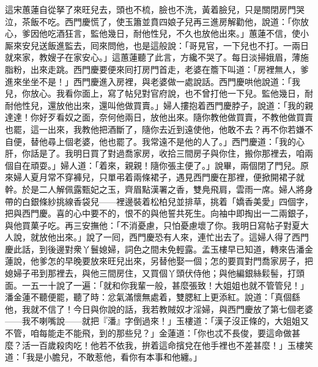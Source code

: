 這宋蕙蓮自從拏了來旺兒去，頭也不梳，臉也不洗，黃着臉兒，只是關閉房門哭泣，茶飯不吃。西門慶慌了，使玉簫並賁四娘子兒再三進房解勸他，說道：「你放心，爹因他吃酒狂言，監他幾日，耐他性兒，不久也放他出來。」蕙蓮不信，使小厮來安兒送飯進監去，囘來問他，也是這般說：「哥見官，一下兒也不打。一兩日就來家，教嫂子在家安心。」這蕙蓮聽了此言，方纔不哭了。每日淡掃娥眉，薄施脂粉，出來走跳。西門慶要便來囘打房門首走，老婆在簷下叫道：「房裡無人，爹進來坐坐不是！」西門慶進入房裡，與老婆做一處說話。西門慶哄他說道：「我兒，你放心。我看你面上，寫了帖兒對官府說，也不曾打他一下兒。監他幾日，耐耐他性兒，還放他出來，還叫他做買賣。」婦人摟抱着西門慶脖子，說道：「我的親達達！你好歹看奴之面，{}奈何他兩日，放他出來。隨你教他做買賣，不教他做買賣也罷，這一出來，我教他把酒斷了，隨你去近到遠使他，他敢不去？再不你若嫌不自便，替他尋上個老婆，他也罷了。我常遠不是他的人了。」西門慶道：「我的心肝，你話是了。我明日買了對過喬家房，收拾三間房子與你住，搬你那裡去，咱兩個自在頑耍。」婦人道：「着來，親親！隨你張主便了。」說畢，兩個閉了門兒。原來婦人夏月常不穿褲兒，只單弔着兩條裙子，遇見西門慶在那裡，便掀開裙子就幹。於是二人解佩露甄妃之玉，齊眉點漢署之香，雙鳧飛肩，雲雨一席。婦人將身帶的白銀條紗挑線香袋兒——裡邊裝着松柏兒並排草，挑着「嬌香美愛」四個字，把與西門慶。喜的心中要不的，恨不的與他誓共死生。向袖中即掏出一二兩銀子，與他買菓子吃。再三安撫他：「不消憂慮，只怕憂慮壞了你。我明日寫帖子對夏大人說，就放他出來。」說了一囘，西門慶恐有人來，連忙出去了。這婦人得了西門慶此話，到後邊對衆丫鬟媳婦，詞色之間未免輕露。{}孟玉樓早已知道，轉來告潘金蓮說，他爹怎的早晚要放來旺兒出來，另替他娶一個；怎的要買對門喬家房子，把媳婦子弔到那裡去，與他三間房住，又買個丫頭伏侍他；與他編銀絲鬏髻，打頭面。一五一十說了一遍：「就和你我輩一般，甚麼張致！大姐姐也就不管管兒！」潘金蓮不聽便罷，聽了時：忿氣滿懷無處着，雙腮紅上更添紅。說道：「真個繇他，我就不信了！今日與你說的話，我若教賊奴才淫婦，與西門慶放了第七個老婆——我不喇嘴說——就把『潘』字倒過來！」玉樓道：「漢子沒正條的，大姐姐又不管，咱每能走不能飛，到的那些兒？」{}金蓮道：「你也忒不長俊，要這命做甚麼？活一百歲殺肉吃！他若不依我，拚着這命擯兌在他手裡也不差甚麼！」玉樓笑道：「我是小膽兒，不敢惹他，看你有本事和他纏。」

